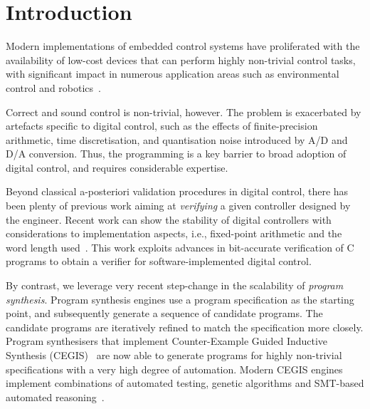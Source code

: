 \documentclass{sig-alternate-05-2015}
\begin{document}
%
%
\printccsdesc



\section{Introduction}

Modern implementations of embedded control systems have proliferated with the
availability of low-cost devices that can perform highly non-trivial control
tasks, with significant impact in numerous application areas such as
environmental control and robotics~\cite{astrom1997computer, Franklin15}.

Correct and sound control is non-trivial, however. The problem is exacerbated by
artefacts specific to digital control, such as the effects of
finite-precision arithmetic, time discretisation, and quantisation noise
introduced by A/D and D/A conversion.  Thus, the programming is a key
barrier to broad adoption of digital control, and requires considerable
expertise.

Beyond classical a-posteriori validation procedures in digital control, 
there has been plenty of previous work aiming at \emph{verifying} a given
controller designed by the engineer.  Recent work can show the stability of 
digital controllers with considerations to implementation aspects, i.e.,
fixed-point arithmetic and the word length used~\cite{Bessa16}.  This work
exploits advances in bit-accurate verification of C programs to obtain a
verifier for software-implemented digital control.

By contrast, we leverage very recent step-change in the scalability of
\emph{program synthesis}.  Program synthesis engines use a program
specification as the starting point, and subsequently generate a sequence of
candidate programs.  The candidate programs are iteratively refined to match
the specification more closely.  Program synthesisers that implement
Counter-Example Guided Inductive Synthesis (CEGIS)~\cite{sketch} are now
able to generate programs for highly non-trivial specifications with a very
high degree of automation.  Modern CEGIS engines implement combinations of
automated testing, genetic algorithms and SMT-based automated
reasoning~\cite{DBLP:conf/lpar/DavidKL15, DBLP:conf/cav/0001A14}.
\end{document}
